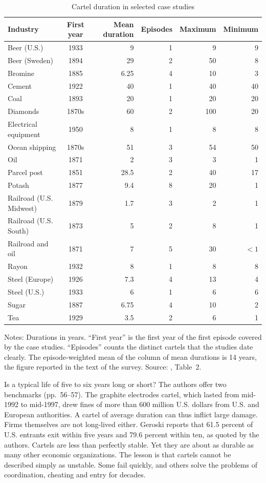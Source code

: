 \begin{table}[htbp]
\centering
\caption{Cartel duration in selected case studies}\label{tab:12-ls-cases}
\footnotesize
\begin{tabular}{@{}l c r r r r@{}}
\toprule
Industry & First year & Mean duration & Episodes & Maximum & Minimum\\
\midrule
Beer (U.S.) & 1933 & 9 & 1 & 9 & 9\\
Beer (Sweden) & 1894 & 29 & 2 & 50 & 8\\
Bromine & 1885 & 6.25 & 4 & 10 & 3\\
Cement & 1922 & 40 & 1 & 40 & 40\\
Coal & 1893 & 20 & 1 & 20 & 20\\
Diamonds & 1870s & 60 & 2 & 100 & 20\\
Electrical equipment & 1950 & 8 & 1 & 8 & 8\\
Ocean shipping & 1870s & 51 & 3 & 54 & 50\\
Oil & 1871 & 2 & 3 & 3 & 1\\
Parcel post & 1851 & 28.5 & 2 & 40 & 17\\
Potash & 1877 & 9.4 & 8 & 20 & 1\\
Railroad (U.S. Midwest) & 1879 & 1.7 & 3 & 2 & 1\\
Railroad (U.S. South) & 1873 & 5 & 2 & 8 & 1\\
Railroad and oil & 1871 & 7 & 5 & 30 & $<1$\\
Rayon & 1932 & 8 & 1 & 8 & 8\\
Steel (Europe) & 1926 & 7.3 & 4 & 13 & 4\\
Steel (U.S.) & 1933 & 6 & 1 & 6 & 6\\
Sugar & 1887 & 6.75 & 4 & 10 & 2\\
Tea & 1929 & 3.5 & 2 & 6 & 1\\
\bottomrule
\end{tabular}

\smallskip
\begin{minipage}{0.86\textwidth}\footnotesize
Notes: Durations in years. ``First year'' is the first year of the first episode covered by the case studies.
``Episodes'' counts the distinct cartels that the studies date clearly. The episode-weighted mean of the column of
mean durations is 14 years, the figure reported in the text of the survey.
Source: \citet{LevensteinSuslow2006}, Table~2.
\end{minipage}
\end{table}

Is a typical life of five to six years long or short? The authors offer two benchmarks (pp.~56--57). The graphite
electrodes cartel, which lasted from mid-1992 to mid-1997, drew fines of more than 600 million U.S. dollars from U.S. and
European authorities. A cartel of average duration can thus inflict large damage. Firms themselves are not long-lived
either. Geroski reports that 61.5 percent of U.S. entrants exit within five years and 79.6 percent within ten, as
quoted by the authors. Cartels are less than perfectly stable. Yet they are about as durable as many other economic
organizations. The lesson is that cartels cannot be described simply as unstable. Some fail quickly, and others solve
the problems of coordination, cheating and entry for decades.

